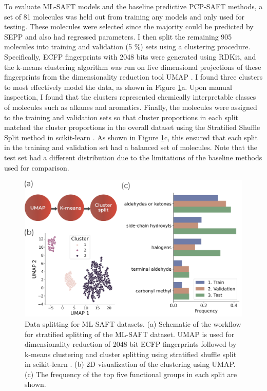 To evaluate ML-SAFT models and the baseline predictive PCP-SAFT methods, a set of 81 molecules was held out from training any models and only used for testing. These molecules were selected since the majority could be predicted by SEPP and also had regressed parameters. I then split the remaining 905 molecules into training and validation (5 \%) sets using a clustering procedure. Specifically, ECFP fingerprints with 2048 bits were generated using RDKit, and the k-means clustering algorithm \cite{MacQueen1967} was run on five dimensional projections of these fingerprints from the dimensionality reduction tool UMAP \cite{McInnes2018}. I found three clusters to most effectively model the data, as shown in Figure \ref{fig:splitting}a. Upon manual inspection, I found that the clusters represented chemically interpretable classes of molecules such as alkanes and aromatics. Finally, the molecules were assigned to the training and validation sets so that cluster proportions in each split matched the cluster proportions in the overall dataset using the Stratified Shuffle Split method in scikit-learn \cite{scikit-learn}. As shown in Figure \ref{fig:splitting}c, this ensured that each split in the training and validation set had a balanced set of molecules. Note that the test set had a different distribution due to the limitations of the baseline methods used for comparison.

\begin{figure}
    \centering
    \includegraphics[width=\textwidth]{gfx/Chapter08/cluster_split.png}
    \caption{Data splitting for ML-SAFT datasets. (a) Schematic of the workflow for stratified splitting of the ML-SAFT dataset. UMAP \cite{McInnes2018} is used for dimensionality reduction of 2048 bit ECFP fingerprints followed by k-means clustering \cite{MacQueen1967} and cluster splitting using stratified shuffle split in scikit-learn \cite{scikit-learn}. (b) 2D visualization of the clustering using UMAP. (c) The frequency of the top five functional groups in each split are shown.}
    \label{fig:splitting}
\end{figure}

